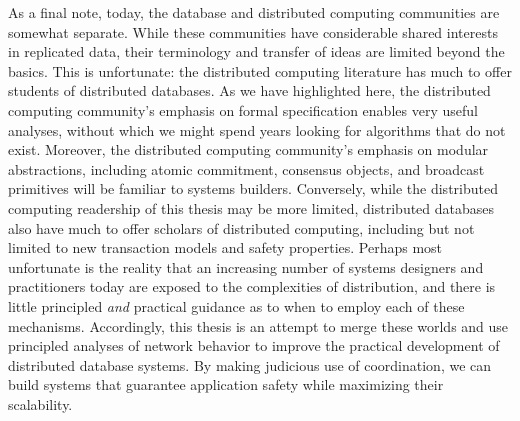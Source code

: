 As a final note, today, the database and distributed computing
communities are somewhat separate. While these communities have
considerable shared interests in replicated data, their terminology
and transfer of ideas are limited beyond the basics. This is
unfortunate: the distributed computing literature has much to offer
students of distributed databases. As we have highlighted here, the
distributed computing community's emphasis on formal specification
enables very useful analyses, without which we might spend years
looking for algorithms that do not exist. Moreover, the distributed
computing community's emphasis on modular abstractions, including
atomic commitment, consensus objects, and broadcast primitives will be
familiar to systems builders. Conversely, while the distributed
computing readership of this thesis may be more limited, distributed
databases also have much to offer scholars of distributed computing,
including but not limited to new transaction models and safety
properties. Perhaps most unfortunate is the reality that an increasing
number of systems designers and practitioners today are exposed to the
complexities of distribution, and there is little principled
\textit{and} practical guidance as to when to employ each of these
mechanisms. Accordingly, this thesis is an attempt to merge these
worlds and use principled analyses of network behavior to improve the
practical development of distributed database systems. By making
judicious use of coordination, we can build systems that guarantee
application safety while maximizing their scalability.

